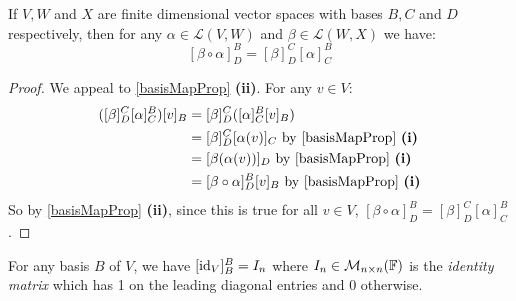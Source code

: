 \documentclass[../main.tex]{subfiles}
\begin{document}
\begin{proposition}
  If $V, W$ and $X$ are finite dimensional vector spaces with bases $B, C$ and $D$ respectively, then for any $\alpha \in \mathcal{L}(V, W)$ and $\beta \in \mathcal{L}(W, X)$ we have: \label{matrixComp}
  \[
    [\beta \circ \alpha]^{B}_{D} = [\beta]^{C}_{D}[\alpha]^{B}_{C}
  \]
\end{proposition}
\begin{proof}
  We appeal to \cref{basisMapProp} \textbf{(ii)}.
  For any $v \in V$:
  \begin{align*}
    ([\beta]^{C}_{D} [\alpha]^{B}_{C}) [v]_B &= [\beta]^{C}_{D} ([\alpha]^{B}_{C}[v]_B) \\
                                             &= [\beta]^{C}_{D} [\alpha(v)]_{C} \text{ by \cref{basisMapProp} \textbf{(i)}} \\
                                             &= [\beta(\alpha(v))]_{D} \text{ by \cref{basisMapProp} \textbf{(i)}} \\
                                             &= [\beta \circ \alpha]^{B}_{D}[v]_B \text{ by \cref{basisMapProp} \textbf{(i)}}
  \end{align*}
  So by \cref{basisMapProp} \textbf{(ii)}, since this is true for all $v \in V$, $[\beta \circ \alpha]^{B}_{D} = [\beta]^{C}_{D}[\alpha]^{B}_{C}$.
\end{proof}
\begin{remark}
  For any basis $B$ of $V$, we have $[\mathrm{id}_V]^{B}_{B} = I_n$ where $I_n \in \mathcal{M}_{n \times n}(\mathbb{F})$ is the \textit{identity matrix} which has 1 on the leading diagonal entries and 0 otherwise.
\end{remark}
\end{document}
